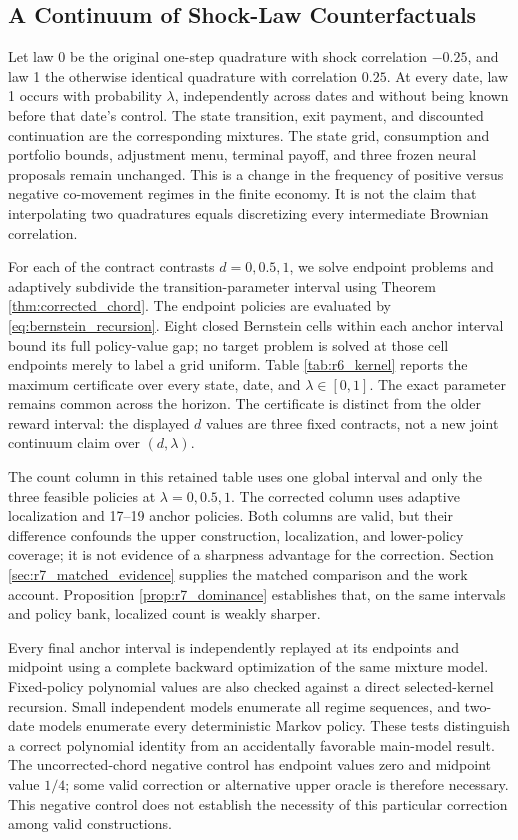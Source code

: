 \subsection{A Continuum of Shock-Law Counterfactuals}
\label{sec:r6_transition_experiment}
Let law 0 be the original one-step quadrature with shock correlation $-0.25$, and law 1 the otherwise identical quadrature with correlation $0.25$. At every date, law 1 occurs with probability $\lambda$, independently across dates and without being known before that date's control. The state transition, exit payment, and discounted continuation are the corresponding mixtures. The state grid, consumption and portfolio bounds, adjustment menu, terminal payoff, and three frozen neural proposals remain unchanged. This is a change in the frequency of positive versus negative co-movement regimes in the finite economy. It is not the claim that interpolating two quadratures equals discretizing every intermediate Brownian correlation.

For each of the contract contrasts $d=0,0.5,1$, we solve endpoint problems and adaptively subdivide the transition-parameter interval using Theorem \ref{thm:corrected_chord}. The endpoint policies are evaluated by \eqref{eq:bernstein_recursion}. Eight closed Bernstein cells within each anchor interval bound its full policy-value gap; no target problem is solved at those cell endpoints merely to label a grid uniform. Table \ref{tab:r6_kernel} reports the maximum certificate over every state, date, and $\lambda\in[0,1]$. The exact parameter remains common across the horizon. The certificate is distinct from the older reward interval: the displayed $d$ values are three fixed contracts, not a new joint continuum claim over $(d,\lambda)$.

The count column in this retained table uses one global interval and only the three feasible policies at $\lambda=0,0.5,1$. The corrected column uses adaptive localization and 17--19 anchor policies. Both columns are valid, but their difference confounds the upper construction, localization, and lower-policy coverage; it is not evidence of a sharpness advantage for the correction. Section \ref{sec:r7_matched_evidence} supplies the matched comparison and the work account. Proposition \ref{prop:r7_dominance} establishes that, on the same intervals and policy bank, localized count is weakly sharper.

Every final anchor interval is independently replayed at its endpoints and midpoint using a complete backward optimization of the same mixture model. Fixed-policy polynomial values are also checked against a direct selected-kernel recursion. Small independent models enumerate all regime sequences, and two-date models enumerate every deterministic Markov policy. These tests distinguish a correct polynomial identity from an accidentally favorable main-model result. The uncorrected-chord negative control has endpoint values zero and midpoint value $1/4$; some valid correction or alternative upper oracle is therefore necessary. This negative control does not establish the necessity of this particular correction among valid constructions.

